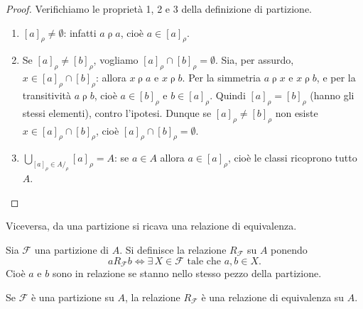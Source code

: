 \documentclass[11pt,a4paper]{article}
\theoremstyle{definition}
\begin{document}
\begin{proof}
Verifichiamo le proprietà 1, 2 e 3 della definizione di partizione.
\begin{enumerate}
    \item $[a]_\rho \neq \emptyset$: infatti $a \mathrel{\rho} a$, cioè
          $a \in [a]_\rho$.
    \item Se $[a]_\rho \neq [b]_\rho$, vogliamo $[a]_\rho \cap [b]_\rho =
          \emptyset$. Sia, per assurdo, $x \in [a]_\rho \cap [b]_\rho$:
          allora $x \mathrel{\rho} a$ e $x \mathrel{\rho} b$. Per la
          simmetria $a \mathrel{\rho} x$ e $x \mathrel{\rho} b$, e per la
          transitività $a \mathrel{\rho} b$, cioè $a \in [b]_\rho$ e
          $b \in [a]_\rho$. Quindi $[a]_\rho = [b]_\rho$ (hanno gli stessi
          elementi), contro l'ipotesi. Dunque se $[a]_\rho \neq
          [b]_\rho$ non esiste $x \in [a]_\rho \cap [b]_\rho$, cioè
          $[a]_\rho \cap [b]_\rho = \emptyset$.
    \item $\displaystyle \bigcup_{[a]_\rho \in A/_\rho} [a]_\rho = A$:
          se $a \in A$ allora $a \in [a]_\rho$, cioè le classi
          ricoprono tutto $A$. \qedhere
\end{enumerate}
\end{proof}

Viceversa, da una partizione si ricava una relazione di equivalenza.

\begin{definizione}
Sia $\mathcal{F}$ una partizione di $A$. Si definisce la relazione
$R_\mathcal{F}$ su $A$ ponendo
\[
a \mathrel{R_\mathcal{F}} b \iff \exists\, X \in \mathcal{F} \text{ tale
che } a, b \in X.
\]
Cioè $a$ e $b$ sono in relazione se stanno nello stesso pezzo della
partizione.
\end{definizione}

\begin{proposizione}[B]
Se $\mathcal{F}$ è una partizione su $A$, la relazione $R_\mathcal{F}$ è
una relazione di equivalenza su $A$.
\end{proposizione}
\end{document}
